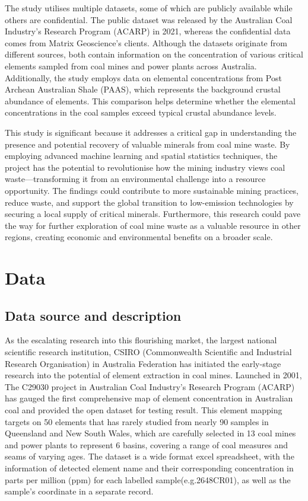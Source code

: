 \documentclass[11pt,a4paper,]{article}
\begin{document}
The study utilises multiple datasets, some of which are publicly available while others are confidential. The public dataset was released by the Australian Coal Industry's Research Program (ACARP) in 2021, whereas the confidential data comes from Matrix Geoscience's clients. Although the datasets originate from different sources, both contain information on the concentration of various critical elements sampled from coal mines and power plants across Australia. Additionally, the study employs data on elemental concentrations from Post Archean Australian Shale (PAAS), which represents the background crustal abundance of elements. This comparison helps determine whether the elemental concentrations in the coal samples exceed typical crustal abundance levels.

This study is significant because it addresses a critical gap in understanding the presence and potential recovery of valuable minerals from coal mine waste. By employing advanced machine learning and spatial statistics techniques, the project has the potential to revolutionise how the mining industry views coal waste---transforming it from an environmental challenge into a resource opportunity. The findings could contribute to more sustainable mining practices, reduce waste, and support the global transition to low-emission technologies by securing a local supply of critical minerals. Furthermore, this research could pave the way for further exploration of coal mine waste as a valuable resource in other regions, creating economic and environmental benefits on a broader scale.

\section{Data}\label{data}

\subsection{Data source and description}\label{data-source-and-description}

As the escalating research into this flourishing market, the largest national scientific research institution, CSIRO (Commonwealth Scientific and Industrial Research Organisation) in Australia Federation has initiated the early-stage research into the potential of element extraction in coal mines. Launched in 2001, The C29030 project in Australian Coal Industry's Research Program (ACARP) \autocite{Hodgkinson2021} has gauged the first comprehensive map of element concentration in Australian coal and provided the open dataset for testing result. This element mapping targets on 50 elements that has rarely studied from nearly 90 samples in Queensland and New South Wales, which are carefully selected in 13 coal mines and power plants to represent 6 basins, covering a range of coal measures and seams of varying ages. The dataset is a wide format excel spreadsheet, with the information of detected element name and their corresponding concentration in parts per million (ppm) for each labelled sample(e.g.2648CR01), as well as the sample's coordinate in a separate record.
\end{document}
